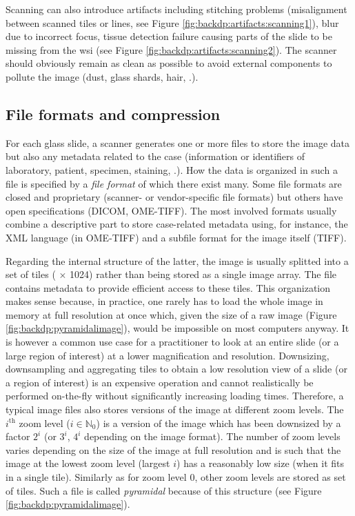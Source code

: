 Scanning can also introduce artifacts including stitching problems (\ie misalignment between scanned tiles or lines, see Figure \ref{fig:backdp:artifacts:scanning1}), blur due to incorrect focus, tissue detection failure causing parts of the slide to be missing from the \acrshort{wsi} (see Figure \ref{fig:backdp:artifacts:scanning2}). The scanner should obviously remain as clean as possible to avoid external components to pollute the image (\eg dust, glass shards, hair, \etc.). 

\subsection{File formats and compression}
\label{ssec:backdp:storingviewing}

For each glass slide, a scanner generates one or more files to store the image data but also any metadata related to the case (information or identifiers of laboratory, patient, specimen, staining, \etc.). How the data is organized in such a file is specified by a \textit{file format} of which there exist many. Some file formats are closed and proprietary (\eg scanner- or vendor-specific file formats) but others have open specifications (\eg DICOM, OME-TIFF). The most involved formats usually combine a descriptive part to store case-related metadata using, for instance, the XML language (\eg in OME-TIFF) and a subfile format for the image itself (\eg TIFF). 

Regarding the internal structure of the latter, the image is usually splitted into a set of tiles ( $\times$ 1024) rather than being stored as a single image array. The file contains metadata to provide efficient access to these tiles. This organization makes sense because, in practice, one rarely has to load the whole image in memory at full resolution at once which, given the size of a raw image (\eg Figure \ref{fig:backdp:pyramidalimage}), would be impossible on most computers anyway. It is however a common use case for a practitioner to look at an entire slide (or a large region of interest) at a lower magnification and resolution. Downsizing, downsampling and aggregating tiles to obtain a low resolution view of a slide (or a region of interest) is an expensive operation and cannot realistically be performed on-the-fly without significantly increasing loading times. Therefore, a typical image files also stores versions of the image at different zoom levels. The $i^{\text{th}}$ zoom level ($i \in \mathbb{N}_0$) is a version of the image which has been downsized by a factor $2^i$ (or $3^i$, $4^i$ depending on the image format). The number of zoom levels varies depending on the size of the image at full resolution and is such that the image at the lowest zoom level (\ie largest $i$) has a reasonably low size (\eg when it fits in a single tile). Similarly as for zoom level 0, other zoom levels are stored as set of tiles. Such a file is called \textit{pyramidal} because of this structure (see Figure \ref{fig:backdp:pyramidalimage}).

